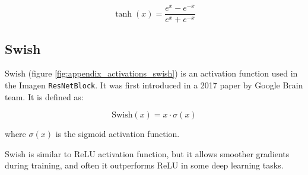 \begin{equation*}
    \tanh(x) = \frac{e^{x} - e^{-x}}{e^{x} + e^{-x}}
\end{equation*}








\subsection*{Swish}

Swish (figure \ref{fig:appendix_activations_swish}) is an activation function used in the Imagen \texttt{ResNetBlock}. It was first introduced in a 2017 paper \cite{ramachandran2017swish} by Google Brain team. It is defined as:

\begin{equation}
    \text{Swish}(x) = x \cdot \sigma(x)
    \label{eq:appendix_activations_swish}
\end{equation}

where $\sigma(x)$ is the sigmoid activation function.

Swish is similar to ReLU activation function, but it allows smoother gradients during training, and often it outperforms ReLU in some deep learning tasks.

